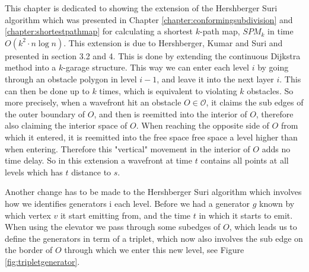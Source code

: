\label{chapter:shortestpathobstaclesviolation}

This chapter is dedicated to showing the extension of the Hershberger Suri
algorithm which was presented in Chapter \ref{chapter:conformingsubdivision}
and \ref{chapter:shortestpathmap} for calculating a shortest $k$-path map,
$SPM_k$ in time $O(k^2 \cdot n \log n)$. This extension is due to Hershberger,
Kumar and Suri and presented in \cite{HershbergerKS17} section 3.2 and 4.
This is done by extending the
continuous Dijkstra method into a $k$-garage structure. This way we can enter
each level $i$ by going through an obstacle polygon in level $i-1$, and leave
it into the next layer $i$. This can then be done up to $k$ times, which is
equivalent to violating $k$ obstacles. So more precisely, when a wavefront hit
an obstacle $O \in \mathcal{O}$, it claims the sub edges of the outer boundary
of $O$, and then is reemitted into the interior of $O$, therefore also
claiming the interior space of $O$. When reaching the opposite side of $O$ from
which it entered, it is reemitted into the free space free space a level
higher than when entering. Therefore this "vertical" movement in the interior
of $O$ adds no time delay. So in this extension a wavefront at time $t$
contains all points at all levels which has $t$ distance to $s$. 

Another change has to be made to the Hershberger Suri algorithm which involves
how we identifies generators i each level. Before we had a generator $g$ known
by which vertex $v$ it start emitting from, and the time $t$ in which it starts
to emit. When using the elevator we pass through some subedges of $O$, which
leads us to define the generators in term of a triplet, which now also involves
the sub edge on the border of $O$ through which we enter this new level, see
Figure \ref{fig:tripletgenerator}.

